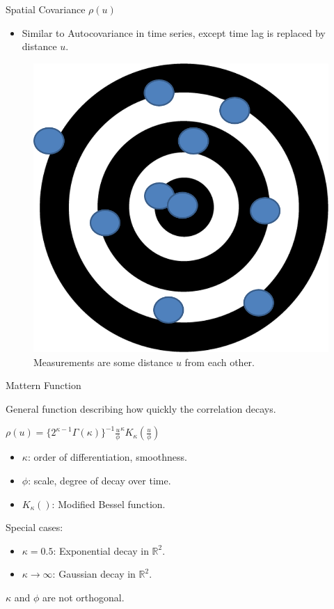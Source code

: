 \documentclass{beamer}
\begin{document}
\begin{frame}{Spatial Covariance $\rho(u)$}
\begin{itemize}
	\item {Similar to Autocovariance in time series, except time lag is replaced by distance $u$.}
\end{itemize}
  	\begin{figure}
	\centering
		\includegraphics[scale = 0.33]{Images/BullsEyeCovariance.png}
		\caption{ { \scriptsize Measurements are some distance $u$ from each other.}}
	\end{figure}
\end{frame}

\begin{frame}{Mattern Function}{}
  \begin{itemize}
  \item General function describing how quickly the correlation decays.
  \item { 
  		$\rho(u) =\{2^{\kappa-1} \Gamma(\kappa)\}^{-1} \frac{u}{\phi}^\kappa K_\kappa (\frac{u}{\phi})$
  \begin{itemize}
  	\item {$\kappa$: order of differentiation, smoothness.}
  	\item{$\phi$: scale, degree of decay over time.}
  	\item $K_\kappa()$: Modified Bessel function.
  \end{itemize}
  \item  Special cases:
  	\begin{itemize}
  		\item $\kappa = 0.5$: Exponential decay in $\mathbb{R}^2$.
    	\item $\kappa \rightarrow \infty$: Gaussian decay in $\mathbb{R}^2$.
  	\end{itemize}
  \item $\kappa$ and $\phi$ are not orthogonal.}
  \end{itemize}
\end{frame}
\end{document}
